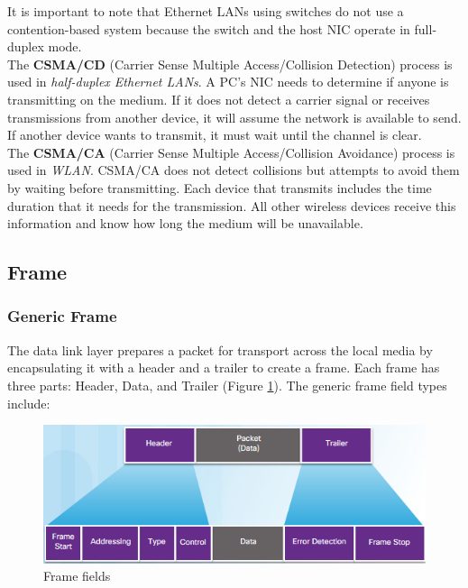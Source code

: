 It is important to note that Ethernet LANs using switches do not use a contention-based system because the switch and the host NIC operate in full-duplex mode.\\

The \textbf{CSMA/CD} (Carrier Sense Multiple Access/Collision Detection) process is used in \emph{half-duplex Ethernet LANs}. A PC's NIC needs to determine if anyone is transmitting on the medium. If it does not detect a carrier signal or receives transmissions from another device, it will assume the network is available to send. If another device wants to transmit, it must wait until the channel is clear. \\

The \textbf{CSMA/CA} (Carrier Sense Multiple Access/Collision Avoidance) process is used in \emph{WLAN}. CSMA/CA does not detect collisions but attempts to avoid them by waiting before transmitting. Each device that transmits includes the time duration that it needs for the transmission. All other wireless devices receive this information and know how long the medium will be unavailable. 

\subsection{Frame}

\subsubsection{Generic Frame}

The data link layer prepares a packet for transport across the local media by encapsulating it with a header and a trailer to create a frame. Each frame has three parts: Header, Data, and Trailer (Figure \ref{Frame}). The generic frame field types include:

\begin{figure}[hbtp]
\caption{Frame fields}\label{Frame}
\centering
\includegraphics[scale=0.8]{pictures/Frame.PNG}
\end{figure}


